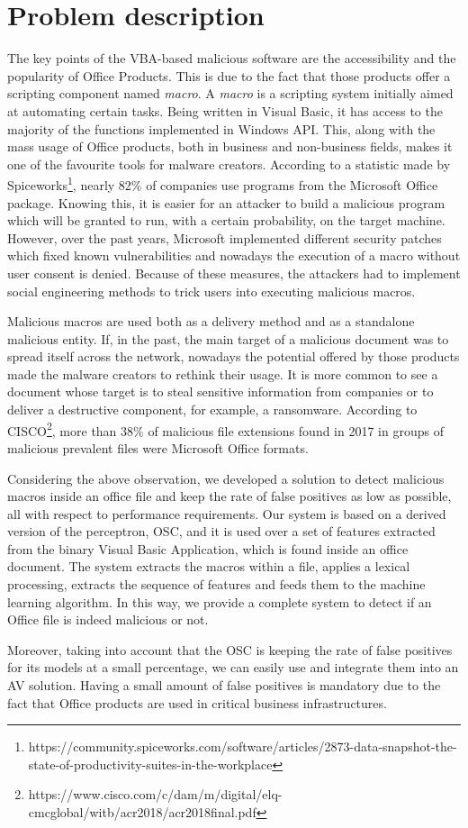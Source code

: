\section{Problem description}

The key points of the VBA-based malicious software are the accessibility and the popularity of Office Products. This is due to the fact that those products offer a scripting component named \textit{macro}. A \textit{macro} is a scripting system initially aimed at automating certain tasks. Being written in Visual Basic, it has access to the majority of the functions implemented in Windows API. This, along with the mass usage of Office products, both in business and non-business fields, makes it one of the favourite tools for malware creators. According to a statistic made by Spiceworks\footnote{https://community.spiceworks.com/software/articles/2873-data-snapshot-the-state-of-productivity-suites-in-the-workplace}, nearly 82\% of companies use programs from the Microsoft Office package. Knowing this, it is easier for an attacker to build a malicious program which will be granted to run, with a certain probability, on the target machine. However, over the past years, Microsoft implemented different security patches which fixed known vulnerabilities and nowadays the execution of a macro without user consent is denied. Because of these measures, the attackers had to implement social engineering methods to trick users into executing malicious macros.
\par
Malicious macros are used both as a delivery method and as a standalone malicious entity. If, in the past, the main target of a malicious document was to spread itself across the network, nowadays the potential offered by those products made the malware creators to rethink their usage. It is more common to see a document whose target is to steal sensitive information from companies or to deliver a destructive component, for example, a ransomware. According to CISCO\footnote{https://www.cisco.com/c/dam/m/digital/elq-cmcglobal/witb/acr2018/acr2018final.pdf}, more than 38\% of malicious file extensions found in 2017 in groups of malicious prevalent files were Microsoft Office formats.
\par
Considering the above observation, we developed a solution to detect malicious macros inside an office file and keep the rate of false positives as low as possible, all with respect to performance requirements. Our system is based on a derived version of the perceptron, OSC\cite{OSC}, and it is used over a set of features extracted from the binary Visual Basic Application, which is found inside an office document. The system extracts the macros within a file, applies a lexical processing, extracts the sequence of features and feeds them to the machine learning algorithm. In this way, we provide a complete system to detect if an Office file is indeed malicious or not.
\par
Moreover, taking into account that the OSC is keeping the rate of false positives for its models at a small percentage, we can easily use and integrate them into an AV solution. Having a small amount of false positives is mandatory due to the fact that Office products are used in critical business infrastructures.
